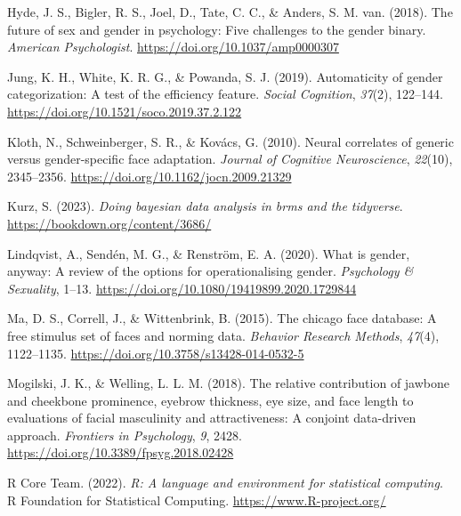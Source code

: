 \documentclass[
  man]{apa7}
\newlength{\cslhangindent}
\newlength{\cslentryspacingunit} %
\newenvironment{CSLReferences}[2] %
 {%
  \setlength{\parindent}{0pt}
  \ifodd #1
  \let\oldpar\par
  \def\par{\hangindent=\cslhangindent\oldpar}
  \fi
  \setlength{\parskip}{#2\cslentryspacingunit}
 }%
 {}
\begin{document}
\begin{CSLReferences}{1}{0}
\leavevmode{}%
Hyde, J. S., Bigler, R. S., Joel, D., Tate, C. C., \& Anders, S. M. van. (2018). The future of sex and gender in psychology: Five challenges to the gender binary. \emph{American Psychologist}. \url{https://doi.org/10.1037/amp0000307}

\leavevmode{}%
Jung, K. H., White, K. R. G., \& Powanda, S. J. (2019). Automaticity of gender categorization: A test of the efficiency feature. \emph{Social Cognition}, \emph{37}(2), 122--144. \url{https://doi.org/10.1521/soco.2019.37.2.122}

\leavevmode{}%
Kloth, N., Schweinberger, S. R., \& Kovács, G. (2010). Neural correlates of generic versus gender-specific face adaptation. \emph{Journal of Cognitive Neuroscience}, \emph{22}(10), 2345--2356. \url{https://doi.org/10.1162/jocn.2009.21329}

\leavevmode{}%
Kurz, S. (2023). \emph{Doing bayesian data analysis in brms and the tidyverse}. \url{https://bookdown.org/content/3686/}

\leavevmode{}%
Lindqvist, A., Sendén, M. G., \& Renström, E. A. (2020). What is gender, anyway: A review of the options for operationalising gender. \emph{Psychology \& Sexuality}, 1--13. \url{https://doi.org/10.1080/19419899.2020.1729844}

\leavevmode{}%
Ma, D. S., Correll, J., \& Wittenbrink, B. (2015). The chicago face database: A free stimulus set of faces and norming data. \emph{Behavior Research Methods}, \emph{47}(4), 1122--1135. \url{https://doi.org/10.3758/s13428-014-0532-5}

\leavevmode{}%
Mogilski, J. K., \& Welling, L. L. M. (2018). The relative contribution of jawbone and cheekbone prominence, eyebrow thickness, eye size, and face length to evaluations of facial masculinity and attractiveness: A conjoint data-driven approach. \emph{Frontiers in Psychology}, \emph{9}, 2428. \url{https://doi.org/10.3389/fpsyg.2018.02428}

\leavevmode{}%
R Core Team. (2022). \emph{R: A language and environment for statistical computing}. R Foundation for Statistical Computing. \url{https://www.R-project.org/}


\end{CSLReferences}
\end{document}
